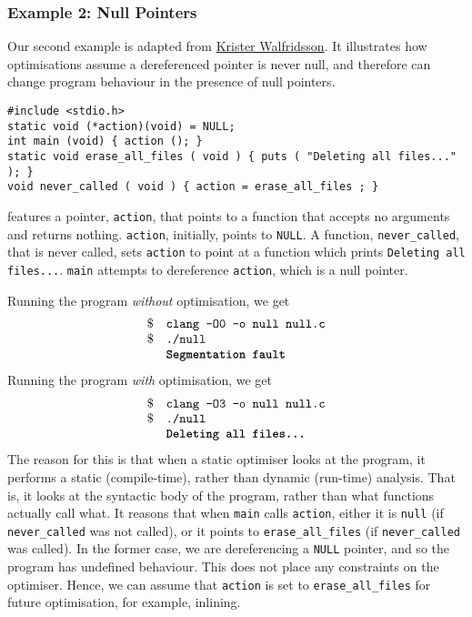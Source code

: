 \subsubsection{Example 2: Null Pointers}
Our second example is adapted from \href{https://kristerw.blogspot.com/2017/09/why-undefined-behavior-may-call-never.html}{Krister Walfridsson}. It illustrates how optimisations assume a dereferenced pointer is never null, and therefore can change program behaviour in the presence of null pointers. 

\begin{code}
\label{code:optimisation-np-overflow}
\begin{verbatim}
#include <stdio.h>
static void (*action)(void) = NULL;
int main (void) { action (); }
static void erase_all_files ( void ) { puts ( "Deleting all files..." ); }
void never_called ( void ) { action = erase_all_files ; }
\end{verbatim}
\end{code}

 features a pointer, \texttt{action}, that points to a function that accepts no arguments and returns nothing. \texttt{action}, initially, points to \texttt{NULL}. A function, \texttt{never\_called}, that is never called, sets \texttt{action} to point at a function which prints \texttt{Deleting all files...}. \texttt{main} attempts to dereference \texttt{action}, which is a null pointer.

Running the program \textit{without} optimisation, we get
\[\begin{array}{ll}
    \$ & \texttt{clang -O0 -o null null.c} \\
    \$ & \texttt{./null} \\
       & \texttt{\textbf{Segmentation fault}}
\end{array}\]
Running the program \textit{with} optimisation, we get
\[\begin{array}{ll}
    \$ & \texttt{clang -O3 -o null null.c} \\
    \$ & \texttt{./null} \\
       & \texttt{\textbf{Deleting all files...}}
\end{array}\]
The reason for this is that when a static optimiser looks at the program, it performs a static (compile-time), rather than dynamic (run-time) analysis. That is, it looks at the syntactic body of the program, rather than what functions actually call what. It reasons that when \texttt{main} calls \texttt{action}, either it is \texttt{null} (if \texttt{never\_called} was not called), or it points to \texttt{erase\_all\_files} (if \texttt{never\_called} was called). In the former case, we are dereferencing a \texttt{NULL} pointer, and so the program has undefined behaviour. This does not place any constraints on the optimiser. Hence, we can assume that \texttt{action} is set to \texttt{erase\_all\_files} for future optimisation, for example, inlining. 

